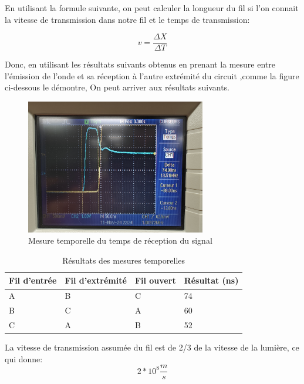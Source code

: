 
 En utilisant la formule suivante, on peut calculer la longueur du fil si l'on connait la vitesse de transmission dans notre fil et le temps de transmission:
 
 \begin{equation}
 v = \frac{\Delta X }{\Delta T} \label{eq:equation-vitesse}
 \end{equation}
 
 Donc, en utilisant les résultats suivants obtenus en prenant la mesure entre l'émission de l'onde et sa réception à l'autre extrémité du circuit
 ,comme la figure ci-dessous le démontre, On peut arriver aux résultats suivants.

 \begin{figure}[H]
    \centering
    \includegraphics[width=0.7\textwidth]{images/a-b-temporel.jpg}
    \caption{Mesure temporelle du temps de réception du signal}
    \label{fig:analyse-temporelle-a-b}
 \end{figure}


 \begin{center}
 \begin{table}[H]
 \caption{Résultats des mesures temporelles} \label{tab:tableau mesures temporel}
 \begin{tabularx}{\textwidth}{ X X X X }
    Fil d'entrée & Fil d'extrémité & Fil ouvert & Résultat (ns) \\
    \hline
    \hline
     A & B & C & 74\\
     B & C & A & 60\\
     C & A & B & 52\\
     \hline
 \end{tabularx}
 \end{table}
 \end{center}


 La vitesse de transmission assumée du fil est de 2/3 de la vitesse de la lumière, ce qui donne: 
 \begin{equation}
    2*10^8 \frac{m}{s}
    \label{vitesse-transmission}
\end{equation}

